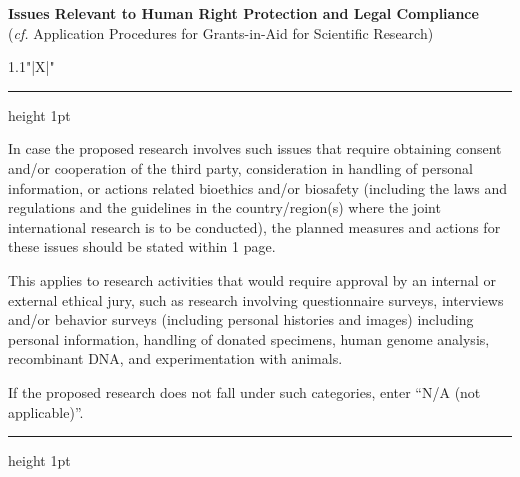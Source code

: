 \documentclass[8pt]{extarticle}
\makeatletter
\newcommand{\thickhline}{%
	\noalign {\ifnum 0=`}\fi \hrule height 1pt
	\futurelet \reserved@a \@xhline
}
\makeatother
\begin{document}
	
\noindent\textbf{\fontsize{12}{12}\selectfont Issues Relevant to Human Right Protection and Legal Compliance}\\
\indent (\textit{cf.} Application Procedures for Grants-in-Aid for Scientific Research)\\
\begin{tabularx}{1.1\linewidth}{"|X|"}
	\thickhline
	In case the proposed research involves such issues that require obtaining consent and/or cooperation of the third party, consideration in handling of personal information, or actions related bioethics and/or biosafety (including the laws and regulations and the guidelines in the country/region(s) where the joint international research is to be conducted), the planned measures and actions for these issues should be stated within 1 page.
	
	This applies to research activities that would require approval by an internal or external ethical jury, such as research involving questionnaire surveys, interviews and/or behavior surveys (including personal histories and images) including personal information, handling of donated specimens, human genome analysis, recombinant DNA, and experimentation with animals.
	
	If the proposed research does not fall under such categories, enter ``N/A (not applicable)''.
	\\
	\thickhline
\end{tabularx}
\end{document}
